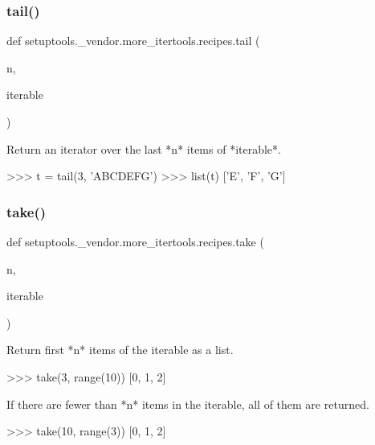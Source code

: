 \subsubsection{\texorpdfstring{tail()}{tail()}}
{\footnotesize\ttfamily def setuptools.\+\_\+vendor.\+more\+\_\+itertools.\+recipes.\+tail (\begin{DoxyParamCaption}\item[{}]{n,  }\item[{}]{iterable }\end{DoxyParamCaption})}

\begin{DoxyVerb}Return an iterator over the last *n* items of *iterable*.

>>> t = tail(3, 'ABCDEFG')
>>> list(t)
['E', 'F', 'G']\end{DoxyVerb}
 \mbox{\label{namespacesetuptools_1_1__vendor_1_1more__itertools_1_1recipes_a3501e9db076ba34775204bbe966d6e32}} 
\subsubsection{\texorpdfstring{take()}{take()}}
{\footnotesize\ttfamily def setuptools.\+\_\+vendor.\+more\+\_\+itertools.\+recipes.\+take (\begin{DoxyParamCaption}\item[{}]{n,  }\item[{}]{iterable }\end{DoxyParamCaption})}

\begin{DoxyVerb}Return first *n* items of the iterable as a list.

    >>> take(3, range(10))
    [0, 1, 2]

If there are fewer than *n* items in the iterable, all of them are
returned.

    >>> take(10, range(3))
    [0, 1, 2]\end{DoxyVerb}
 \mbox{\label{namespacesetuptools_1_1__vendor_1_1more__itertools_1_1recipes_a979b0b0dfbe18c669f394aa38cb3053f}} 
